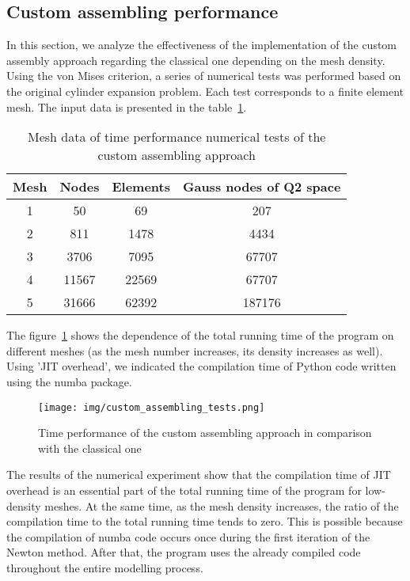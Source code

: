 \documentclass[12pt]{article}
\begin{document}
\subsection{Custom assembling performance}
\label{sec:custom_asssembling_performance}

In this section, we analyze the effectiveness of the implementation of the custom assembly approach regarding the classical one depending on the mesh density. Using the von Mises criterion, a series of numerical tests was performed based on the original cylinder expansion problem. Each test corresponds to a finite element mesh. The input data is presented in the table~\ref{tab:custom_assembling_tests}. 

\begin{table}[H]
	\centering
	\begin{tabular}{|cccc|}
		\hline
		Mesh & Nodes & Elements & Gauss nodes of Q2 space \\
		\hline
		1 & 50	& 69 & 207 \\
		2 & 811 & 1478 & 4434 \\
		3 & 3706 & 7095 & 67707 \\
		4 & 11567 & 22569 & 67707 \\
		5 & 31666 & 62392 & 187176 \\
		\hline
	\end{tabular}
	\caption{Mesh data of time performance numerical tests of the custom assembling approach}
    \label{tab:custom_assembling_tests}
\end{table}

The figure~\ref{fig:custom_assembling_analysis} shows the dependence of the total running time of the program on different meshes (as the mesh number increases, its density increases as well). Using 'JIT overhead', we indicated the compilation time of Python code written using the numba package.

\begin{figure}[H]
    \center
    \texttt{[image: img/custom\_assembling\_tests.png]}
    \caption{Time performance of the custom assembling approach in comparison with the classical one}
    \label{fig:custom_assembling_analysis}
\end{figure}

The results of the numerical experiment show that the compilation time of JIT overhead is an essential part of the total running time of the program for low-density meshes. At the same time, as the mesh density increases, the ratio of the compilation time to the total running time tends to zero. This is possible because the compilation of numba code occurs once during the first iteration of the Newton method. After that, the program uses the already compiled code throughout the entire modelling process.
\end{document}

